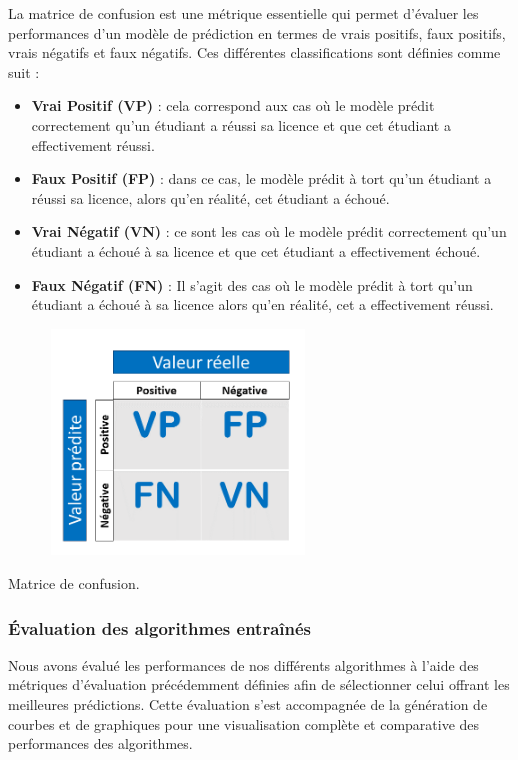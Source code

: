 La matrice de confusion est une métrique essentielle qui permet d'évaluer les performances d'un modèle de prédiction en termes de vrais positifs, faux positifs, vrais négatifs et faux négatifs. Ces différentes classifications sont définies comme suit :

\begin{itemize}
	 \item[\ding{118}] \textbf{Vrai Positif (VP)} : cela correspond aux cas où le modèle prédit correctement qu'un étudiant a réussi sa licence et que cet étudiant a effectivement réussi.
	\item[\ding{118}] \textbf{Faux Positif (FP)} : dans ce cas, le modèle prédit à tort qu'un étudiant a réussi sa licence, alors qu'en réalité, cet étudiant a échoué.
	\item[\ding{118}] \textbf{Vrai Négatif (VN)} : ce sont les cas où le modèle prédit correctement qu'un 	étudiant a échoué à sa licence et que cet étudiant a effectivement échoué.
	\item[\ding{118}] \textbf{Faux Négatif (FN)} : Il s'agit des cas où le modèle prédit à tort qu'un étudiant a échoué à sa licence alors qu'en réalité, cet a effectivement réussi.
\end{itemize}

\begin{table}[H]%
    \center%
    \setlength{\fboxsep}{5pt}%
    \setlength{\fboxrule}{0.5pt}%
    \includegraphics[width=9cm,height=6cm]{images/matrice de confusion.png}%
    \caption{Matrice de confusion.}%
\end{table}

\subsubsection{Évaluation des algorithmes entraînés}
Nous avons évalué les performances de nos différents algorithmes à l'aide des métriques d'évaluation précédemment définies afin de sélectionner celui offrant les meilleures prédictions. Cette évaluation s'est accompagnée de la génération de courbes et de graphiques pour une visualisation complète et comparative des performances des algorithmes.

